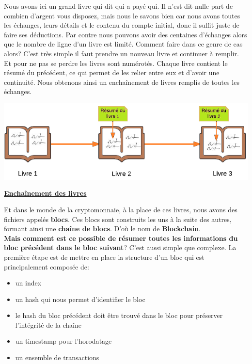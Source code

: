 \documentclass[12pt]{report}
\begin{document}
Nous avons ici un grand livre qui dit qui a payé qui. Il n'est dit nulle part de combien d'argent vous disposez, mais nous le savons bien car nous avons toutes les échanges, leurs détails et le contenu du compte initial, donc il suffit juste de faire ses déductions. Par contre nous pouvons avoir des centaines d'échanges alors que le nombre de ligne d'un livre est limité. Comment faire dans ce genre de cas alors? C'est très simple il faut prendre un nouveau livre et continuer à remplir. Et pour ne pas se perdre les livres sont numérotés. Chaque livre contient le résumé du précédent, ce qui permet de les relier entre eux et d'avoir une continuité. Nous obtenons ainsi un enchaînement de livres remplis de toutes les échanges.\\

\begin{center}
    \includegraphics[width=1\textwidth]{livre_compte_2}

    \textbf{\underline{Enchaînement des livres}} \\[1cm]
\end{center}

\hspace{1cm} Et dans le monde de la cryptomonnaie, à la place de ces livres, nous avons des fichiers appelés \textbf{blocs}. Ces blocs sont construits les uns à la suite des autres, formant ainsi une \textbf{chaîne de blocs}. D'où le nom de \textbf{Blockchain}.\\

\hspace{1cm} \textbf{Mais comment est ce possible de résumer toutes les informations du bloc précédent dans le bloc suivant}? C'est aussi simple que complexe. La première étape est de mettre en place la structure d'un bloc qui est principalement composée de:
\begin{itemize}
    \item un index
    \item un hash qui nous permet d'identifier le bloc
    \item le hash du bloc précédent doit être trouvé dans le bloc pour préserver l'intégrité de la chaîne
    \item un timestamp pour l'horodatage 
    \item un ensemble de transactions
\end{itemize}
\end{document}
